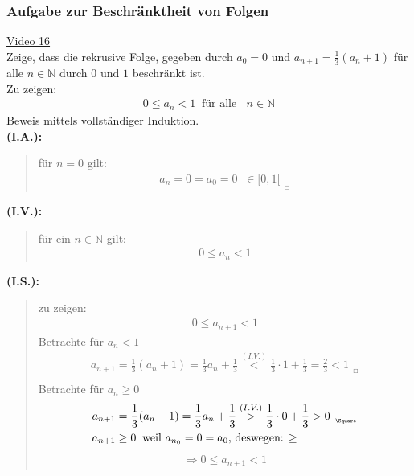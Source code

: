 \subsubsection{Aufgabe zur Beschränktheit von Folgen }
\href{https://youtu.be/w8bu4mqcZrQ}{Video 16}\\
Zeige, dass die rekrusive Folge, gegeben durch $ a_0=0 $ und $ a_{n+1}=\frac{1}{3}(a_n+1)$ für alle $ n\in \mathbb{N} $ durch $ 0 $ und $ 1 $ beschränkt ist.\vspace*{2mm}\\
Zu zeigen:\\
\begin{align*}
0\leq a_n < 1 \;\;\text{für alle }\;\;n\in \mathbb{N}
\end{align*}
Beweis mittels vollständiger Induktion.\\
\textbf{\textbullet \;\; (I.A.):}\\
\begin{quote}
	für $ n=0 $ gilt:\\
	\begin{align*}
	a_n=0=a_0=0\;\;\in[0,1 [_{\;\;_{\Square}}
	\end{align*}
	
\end{quote}
\textbf{\textbullet \;\; (I.V.):}\\
\begin{quote}
	für ein $ n\in\mathbb{N} $ gilt:\\
	\begin{align*}
	0\leq a_n < 1
	\end{align*}
\end{quote}
\textbf{\textbullet \;\; (I.S.):}\\
\begin{quote}
	zu zeigen:\\
	\begin{align*}
	0\leq a_{n+1} < 1
	\end{align*}
	Betrachte für $ a_n<1 $\\
	\begin{align*}
	a_{n+1}=\frac{1}{3}(a_n+1)=\frac{1}{3}a_n+\frac{1}{3}\overset{(I.V.)}{<}\frac{1}{3}\cdot1 +\frac{1}{3}=\frac{2}{3}<1_{\;\;_{\Square}}\\
	\end{align*}
	Betrachte für $ a_n\geq 0 $\\
	\begin{align*}
	&a_{n+1}=\frac{1}{3}(a_n+1)=\frac{1}{3}a_n+\frac{1}{3}\overset{(I.V.)}{>}\frac{1}{3}\cdot 0 +\frac{1}{3}>0_{\;\;_{\Square}}\\
	&a_{n+1}\geq 0 \;\;\text{weil $ a_{n_{0}}=0=a_0 $, deswegen: $ \geq $ }
	\end{align*}
	\begin{align*}
	\Rightarrow 0\leq a_{n+1} < 1
	\end{align*}
\end{quote}
